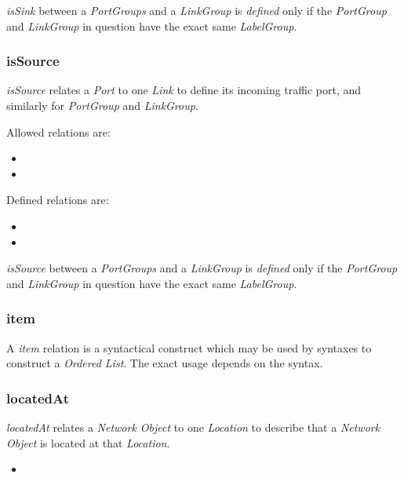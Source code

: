 \emph{isSink} between a \emph{PortGroups} and a \emph{LinkGroup} is \emph{defined} only if the \emph{PortGroup} and \emph{LinkGroup} in question have the exact same \emph{LabelGroup}.


\subsubsection{isSource}%
\label{rel:isSource}

\emph{isSource} relates a \emph{Port} to one \emph{Link} to define its incoming traffic port, and similarly for \emph{PortGroup} and \emph{LinkGroup}.

Allowed relations are:
\begin{itemize}
    \item {}
    \item {}
\end{itemize}

Defined relations are:
\begin{itemize}
    \item {}
    \item {}
\end{itemize}

\emph{isSource} between a \emph{PortGroups} and a \emph{LinkGroup} is \emph{defined} only if the \emph{PortGroup} and \emph{LinkGroup} in question have the exact same \emph{LabelGroup}.


\subsubsection{item}%
\label{class:item}

A \emph{item} relation is a syntactical construct which may be used by syntaxes to construct a \emph{Ordered List}. The exact usage depends on the syntax.


\subsubsection{locatedAt}%
\label{rel:locatedAt}

\emph{locatedAt} relates a \emph{Network Object} to one \emph{Location} to describe that a \emph{Network Object} is located at that \emph{Location}.

\begin{itemize}
    \item {}
\end{itemize}


